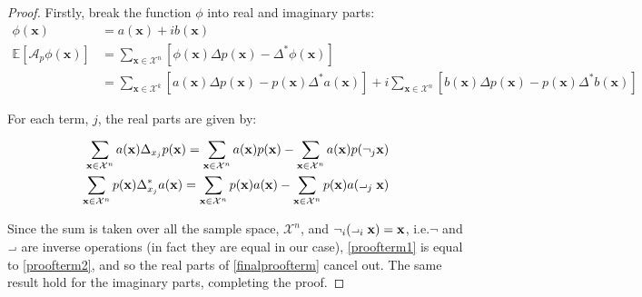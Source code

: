 \begin{proof}

Firstly, break the function $\phi$ into real and imaginary parts:
\begin{align}
    \phi(\mathbf{x}) &= a(\mathbf{x}) +ib(\mathbf{x})\\
     \mathbb{E}[\mathcal{A}_p \phi(\mathbf{x})] &= \sum\limits_{\mathbf{x} \in \mathcal{X}^n}\left[\phi(\mathbf{x})\Delta p(\mathbf{x}) - \Delta^*\phi(\mathbf{x})\right]\\
     &= \sum\limits_{\mathbf{x} \in \mathcal{X}^k}\left[a(\mathbf{x})\Delta p(\mathbf{x}) - p(\mathbf{x})\Delta^*a(\mathbf{x})\right]+ i \sum\limits_{\mathbf{x} \in \mathcal{X}^n}\left[b(\mathbf{x})\Delta p(\mathbf{x}) - p(\mathbf{x})\Delta^*b(\mathbf{x})\right] \label{finalproofterm}
\end{align}

For each term, $j$, the real parts are given by:

\begin{align}
    \sum\limits_{\mathbf{x} \in \mathcal{X}^n}a(\mathbf{x})\Delta_{x_j} p(\mathbf{x}) = \sum\limits_{\mathbf{x} \in \mathcal{X}^n}a(\mathbf{x})p(\mathbf{x}) - \sum\limits_{\mathbf{x} \in \mathcal{X}^n}a(\mathbf{x}) p(\neg_j\mathbf{x}) \label{proofterm1}\\
    \sum\limits_{\mathbf{x} \in \mathcal{X}^n} p(\mathbf{x})\Delta_{x_j}^*a(\mathbf{x}) = \sum\limits_{\mathbf{x} \in \mathcal{X}^n}p(\mathbf{x})a(\mathbf{x}) - \sum\limits_{\mathbf{x} \in \mathcal{X}^n}p(\mathbf{x}) a(\revneg_j\mathbf{x}) \label{proofterm2}
\end{align}

Since the sum is taken over all the sample space, $\mathcal{X}^n$, and $\neg_i(\revneg_i \mathbf{x}) = \mathbf{x}$, i.e.\@ $\neg$ and $\revneg$ are inverse operations (in fact they are equal in our case), \eqref{proofterm1} is equal to \eqref{proofterm2}, and so the real parts of \eqref{finalproofterm} cancel out. The same result hold for the imaginary parts, completing the proof.

\end{proof}

